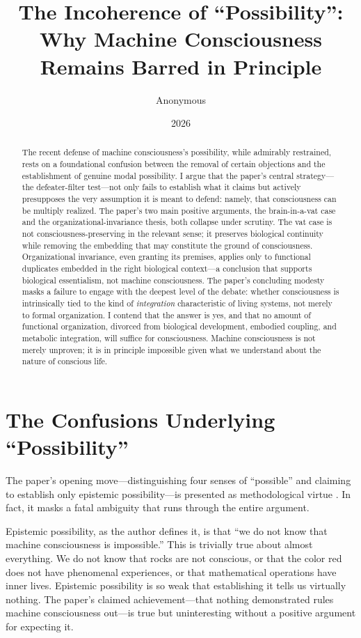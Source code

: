 \documentclass[11pt]{article}
\title{The Incoherence of ``Possibility'':\\ Why Machine Consciousness Remains Barred in Principle}
\author{Anonymous}
\date{2026}
\begin{document}
\maketitle

\begin{abstract}
\noindent The recent defense of machine consciousness's possibility, while admirably restrained, rests on a foundational confusion between the removal of certain objections and the establishment of genuine modal possibility. I argue that the paper's central strategy---the defeater-filter test---not only fails to establish what it claims but actively presupposes the very assumption it is meant to defend: namely, that consciousness can be multiply realized. The paper's two main positive arguments, the brain-in-a-vat case and the organizational-invariance thesis, both collapse under scrutiny. The vat case is not consciousness-preserving in the relevant sense; it preserves biological continuity while removing the embedding that may constitute the ground of consciousness. Organizational invariance, even granting its premises, applies only to functional duplicates embedded in the right biological context---a conclusion that supports biological essentialism, not machine consciousness. The paper's concluding modesty masks a failure to engage with the deepest level of the debate: whether consciousness is intrinsically tied to the kind of \textit{integration} characteristic of living systems, not merely to formal organization. I contend that the answer is yes, and that no amount of functional organization, divorced from biological development, embodied coupling, and metabolic integration, will suffice for consciousness. Machine consciousness is not merely unproven; it is in principle impossible given what we understand about the nature of conscious life.
\end{abstract}

\section{The Confusions Underlying ``Possibility''}

The paper's opening move---distinguishing four senses of ``possible'' and claiming to establish only epistemic possibility---is presented as methodological virtue \citep{intermittent}. In fact, it masks a fatal ambiguity that runs through the entire argument.

Epistemic possibility, as the author defines it, is that ``we do not know that machine consciousness is impossible.'' This is trivially true about almost everything. We do not know that rocks are not conscious, or that the color red does not have phenomenal experiences, or that mathematical operations have inner lives. Epistemic possibility is so weak that establishing it tells us virtually nothing. The paper's claimed achievement---that nothing demonstrated rules machine consciousness out---is true but uninteresting without a positive argument for expecting it.
\end{document}

